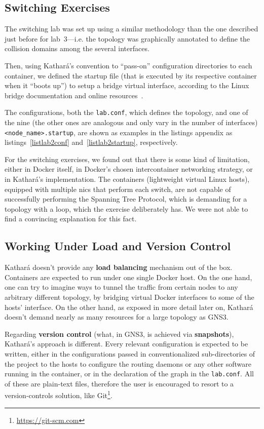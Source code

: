 \subsection{Switching Exercises}

The switching lab was set up using a similar methodology than the one described just before for lab~3---i.e. the topology was graphically annotated to define the collision domains among the several interfaces.

Then, using Kathará's convention to ``pass-on'' configuration directories to each container, we defined the startup file (that is executed by its respective container when it ``boots up'') to setup a bridge virtual interface, according to the Linux bridge documentation and online resources~\cite{brctlman,howtobridgelinux}.

The configurations, both the \texttt{lab.conf}, which defines the topology, and one of the nine (the other ones are analogous and only vary in the number of interfaces) \texttt{<node\_name>.startup}, are shown as examples in the listings appendix as listings~\ref{listlab2conf} and~\ref{listlab2startup}, respectively.

For the switching exercises, we found out that there is some kind of limitation, either in Docker itself, in Docker's chosen intercontainer networking strategy, or in Kathará's implementation.
The containers (lightweight virtual Linux hosts), equipped with multiple \glspl{nic} that perform each switch, are not capable of successfully performing the Spanning Tree Protocol, which is demanding for a topology with a loop, which the exercise deliberately has.
We were not able to find a convincing explanation for this fact.

\subsection{Working Under Load and Version Control}

Kathará doesn't provide any \textbf{load balancing} mechanism out of the box.
Containers are expected to run under one single Docker host.
On the one hand, one can try to imagine ways to tunnel the traffic from certain nodes to any arbitrary different topology, by bridging virtual Docker interfaces to some of the hosts' interface.
On the other hand, as exposed in more detail later on, Kathará doesn't demand nearly as many resources for a large topology as GNS3.

Regarding \textbf{version control} (what, in GNS3, is achieved via \textbf{snapshots}), Kathará's approach is different.
Every relevant configuration is expected to be written, either in the configurations passed in conventionalized sub-directories of the project to the hosts to configure the routing daemons or any other software running in the container, or in the declaration of the graph in the \texttt{lab.conf}.
All of these are plain-text files, therefore the user is encouraged to resort to a version-controls solution, like Git\footnote{\url{https://git-scm.com}}.

